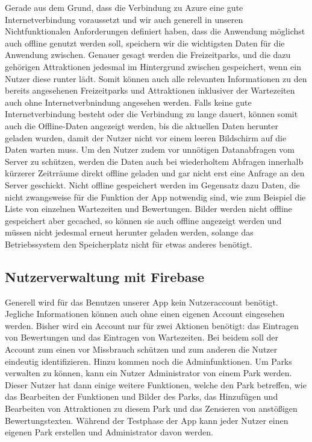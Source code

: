 Gerade aus dem Grund, dass die Verbindung zu Azure eine gute Internetverbindung voraussetzt und wir auch generell in unseren Nichtfunktionalen Anforderungen definiert haben, dass die Anwendung möglichst auch offline genutzt werden soll, speichern wir die wichtigsten Daten für die Anwendung zwischen. Genauer gesagt werden die Freizeitparks, und die dazu gehörigen Attraktionen jedesmal im Hintergrund zwischen gespeichert, wenn ein Nutzer diese runter lädt. Somit können auch alle relevanten Informationen zu den bereits angesehenen Freizeitparks und Attraktionen inklusiver der Wartezeiten auch ohne Internetverbnindung angesehen werden. Falls keine gute Internetverbindung besteht oder die Verbindung zu lange dauert, können somit auch die Offline-Daten angezeigt werden, bis die aktuellen Daten herunter geladen wurden, damit der Nutzer nicht vor einem leeren Bildschirm auf die Daten warten muss. Um den Nutzer zudem vor unnötigen Datanabfragen vom Server zu schützen, werden die Daten auch bei wiederholtem Abfragen innerhalb kürzerer Zeitrräume direkt offline geladen und gar nicht erst eine Anfrage an den Server geschickt. Nicht offline gespeichert werden im Gegensatz dazu Daten, die nicht zwangsweise für die Funktion der App notwendig sind, wie zum Beispiel die Liste von einzelnen Wartezeiten und Bewertungen. Bilder werden nicht offline gespeichert aber gecached, so können sie auch offline angezeigt werden und müssen nicht jedesmal erneut herunter geladen werden, solange das Betriebssystem den Speicherplatz nicht für etwas anderes benötigt.

\subsection{Nutzerverwaltung mit Firebase}
\label{sec:implementierung:besonderheiten:firebase}

Generell wird für das Benutzen unserer App kein Nutzeraccount benötigt. Jegliche Informationen können auch ohne einen eigenen Account eingesehen werden. Bisher wird ein Account nur für zwei Aktionen benötigt: das Eintragen von Bewertungen und das Eintragen von Wartezeiten. Bei beidem soll der Account zum einen vor Missbrauch schützen und zum anderen die Nutzer eindeutig identifizieren. Hinzu kommen noch die Adminfunktionen. Um Parks verwalten zu können, kann ein Nutzer Administrator von einem Park werden. Dieser Nutzer hat dann einige weitere Funktionen, welche den Park betreffen, wie das Bearbeiten der Funktionen und Bilder des Parks, das Hinzufügen und Bearbeiten von Attraktionen zu diesem Park und das Zensieren von anstößigen Bewertungstexten. Während der Testphase der App kann jeder Nutzer einen eigenen Park erstellen und Administrator davon werden.

